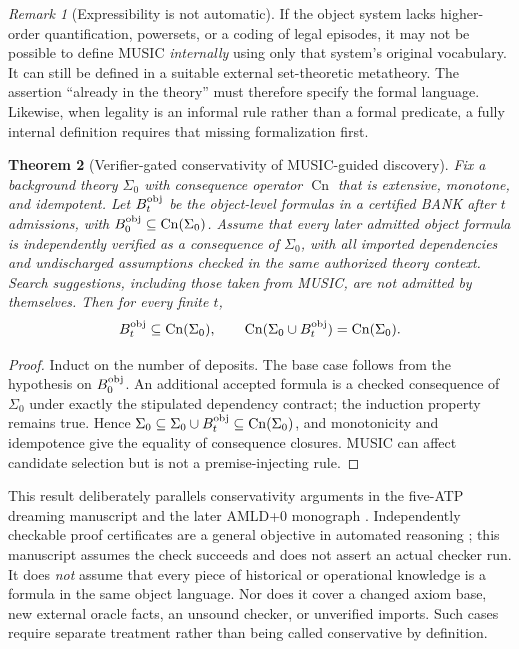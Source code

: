 \documentclass[11pt,letterpaper]{article}
\newtheorem{theorem}{Theorem}[section]
\theoremstyle{definition}
\theoremstyle{remark}
\newtheorem{remark}[theorem]{Remark}
\newcommand{\Cn}{\operatorname{Cn}}
\begin{document}
\begin{remark}[Expressibility is not automatic]
If the object system lacks higher-order quantification, powersets, or a coding of legal episodes, it may not be possible to define MUSIC \emph{internally} using only that system's original vocabulary. It can still be defined in a suitable external set-theoretic metatheory. The assertion ``already in the theory'' must therefore specify the formal language. Likewise, when legality is an informal rule rather than a formal predicate, a fully internal definition requires that missing formalization first.
\end{remark}

\begin{theorem}[Verifier-gated conservativity of MUSIC-guided discovery]\label{thm:bank}
Fix a background theory $\Sigma_0$ with consequence operator $\Cn$ that is extensive, monotone, and idempotent. Let $B_t^{\rm obj}$ be the object-level formulas in a certified BANK after $t$ admissions, with $B_0^{\rm obj}\subseteq\Cn(\Sigma_0)$. Assume that every later admitted object formula is independently verified as a consequence of $\Sigma_0$, with all imported dependencies and undischarged assumptions checked in the same authorized theory context. Search suggestions, including those taken from MUSIC, are not admitted by themselves. Then for every finite $t$,
\begin{equation}\label{eq:bank}
 B_t^{\rm obj}\subseteq\Cn(\Sigma_0),\qquad
 \Cn(\Sigma_0\cup B_t^{\rm obj})=\Cn(\Sigma_0).
\end{equation}
\end{theorem}
\begin{proof}
Induct on the number of deposits. The base case follows from the hypothesis on $B_0^{\rm obj}$. An additional accepted formula is a checked consequence of $\Sigma_0$ under exactly the stipulated dependency contract; the induction property remains true. Hence $\Sigma_0\subseteq\Sigma_0\cup B_t^{\rm obj}\subseteq\Cn(\Sigma_0)$, and monotonicity and idempotence give the equality of consequence closures. MUSIC can affect candidate selection but is not a premise-injecting rule.
\end{proof}

This result deliberately parallels conservativity arguments in the five-ATP dreaming manuscript \cite{tenneson-dreaming} and the later AMLD+0 monograph \cite{tenneson-wcf}. Independently checkable proof certificates are a general objective in automated reasoning \cite{certificate}; this manuscript assumes the check succeeds and does not assert an actual checker run. It does \emph{not} assume that every piece of historical or operational knowledge is a formula in the same object language. Nor does it cover a changed axiom base, new external oracle facts, an unsound checker, or unverified imports. Such cases require separate treatment rather than being called conservative by definition.
\end{document}

